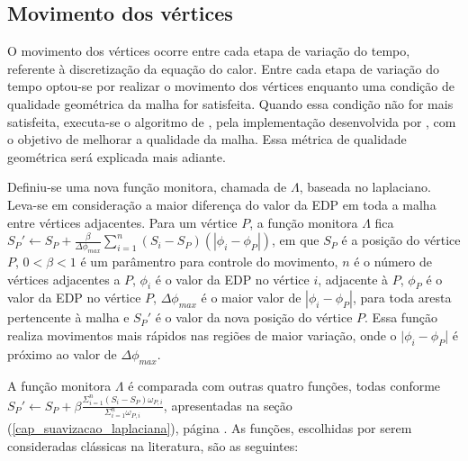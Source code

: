 \subsection{Movimento dos vértices}
\label{cap_movimento_vertices}

O movimento dos vértices ocorre entre cada etapa de variação do tempo, referente à discretização da equação do calor. Entre cada etapa de variação do tempo optou-se por realizar o movimento dos vértices enquanto uma condição de qualidade geométrica da malha for satisfeita. Quando essa condição não for mais satisfeita, executa-se o algoritmo de , pela implementação desenvolvida por , com o objetivo de melhorar a qualidade da malha. Essa métrica de qualidade geométrica será explicada mais adiante.

Definiu-se uma nova função monitora, chamada de $\Lambda$, baseada no laplaciano. Leva-se em consideração a maior diferença do valor da EDP em toda a malha entre vértices adjacentes. Para um vértice $P$, a função monitora $\Lambda$ fica $S_{P}' \leftarrow S_{P} + \frac {\beta} {\Delta \phi_{max} } \sum_{i=1}^{n} (S_i - S_P) (| \phi_i - \phi_P |)$, em que $S_P$ é a posição do vértice $P$, $0 < \beta < 1$ é um parâmentro para controle do movimento, $n$ é o número de vértices adjacentes a $P$, $\phi_i$ é o valor da EDP no vértice $i$, adjacente à $P$, $\phi_P$ é o valor da EDP no vértice $P$, $\Delta \phi_{max}$ é o maior valor de $| \phi_i - \phi_P|$, para toda aresta pertencente à malha e $S_P'$ é o valor da nova posição do vértice $P$. Essa função realiza movimentos mais rápidos nas regiões de maior variação, onde o $| \phi_i - \phi_P $| é próximo ao valor de $\Delta \phi_{max}$.

A função monitora $\Lambda$ é comparada com outras quatro funções, todas conforme $S_{P}' \leftarrow S_{P} + \beta  \frac { \Sigma_{i = 1}^{n} (S_{i} - S_{P}) \omega_{P,i} } { \Sigma_{i = 1}^{n}  \omega_{P,i}  }$, apresentadas na seção (\ref{cap_suavizacao_laplaciana}), página \pageref{cap_suavizacao_laplaciana}. As funções, escolhidas por serem consideradas clássicas na literatura, são as seguintes:

